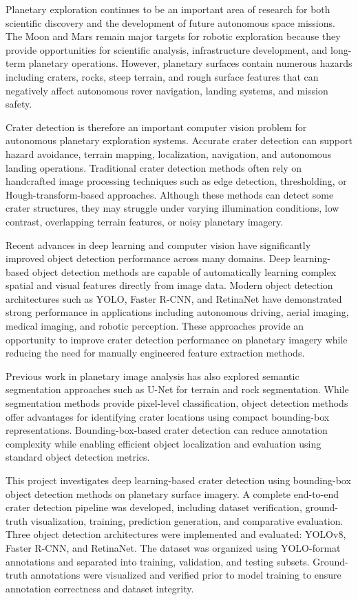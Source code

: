 \documentclass[conference]{IEEEtran}
\begin{document}
	Planetary exploration continues to be an important area of research for both scientific discovery and the development of future autonomous space missions. The Moon and Mars remain major targets for robotic exploration because they provide opportunities for scientific analysis, infrastructure development, and long-term planetary operations. However, planetary surfaces contain numerous hazards including craters, rocks, steep terrain, and rough surface features that can negatively affect autonomous rover navigation, landing systems, and mission safety.
	
	Crater detection is therefore an important computer vision problem for autonomous planetary exploration systems. Accurate crater detection can support hazard avoidance, terrain mapping, localization, navigation, and autonomous landing operations. Traditional crater detection methods often rely on handcrafted image processing techniques such as edge detection, thresholding, or Hough-transform-based approaches. Although these methods can detect some crater structures, they may struggle under varying illumination conditions, low contrast, overlapping terrain features, or noisy planetary imagery.
	
	Recent advances in deep learning and computer vision have significantly improved object detection performance across many domains. Deep learning-based object detection methods are capable of automatically learning complex spatial and visual features directly from image data. Modern object detection architectures such as YOLO, Faster R-CNN, and RetinaNet have demonstrated strong performance in applications including autonomous driving, aerial imaging, medical imaging, and robotic perception. These approaches provide an opportunity to improve crater detection performance on planetary imagery while reducing the need for manually engineered feature extraction methods.
	
	Previous work in planetary image analysis has also explored semantic segmentation approaches such as U-Net for terrain and rock segmentation. While segmentation methods provide pixel-level classification, object detection methods offer advantages for identifying crater locations using compact bounding-box representations. Bounding-box-based crater detection can reduce annotation complexity while enabling efficient object localization and evaluation using standard object detection metrics.
	
	This project investigates deep learning-based crater detection using bounding-box object detection methods on planetary surface imagery. A complete end-to-end crater detection pipeline was developed, including dataset verification, ground-truth visualization, training, prediction generation, and comparative evaluation. Three object detection architectures were implemented and evaluated: YOLOv8, Faster R-CNN, and RetinaNet. The dataset was organized using YOLO-format annotations and separated into training, validation, and testing subsets. Ground-truth annotations were visualized and verified prior to model training to ensure annotation correctness and dataset integrity.
	
\end{document}
